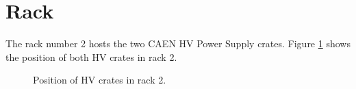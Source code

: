 
\clearpage
\section{Rack}

The rack number 2 hosts the two CAEN HV Power Supply crates.
Figure \ref{fig:calohv:rack2:0} shows the position of both HV crates in rack 2.

\begin{figure}[h!]
  \begin{center}
    \scalebox{1}{}
  \end{center}
  \caption{Position of HV crates in rack 2.}
  \label{fig:calohv:rack2:0}
\end{figure}
